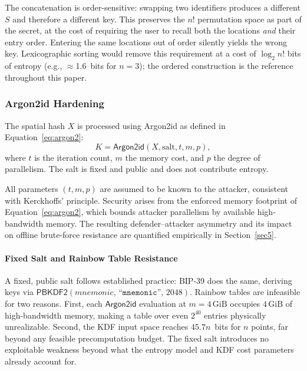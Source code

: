\documentclass[mathematics,article,accept,pdftex,moreauthors]{Definitions/mdpi}
\begin{document}
{The concatenation is order-sensitive: swapping two identifiers produces a different $S$ and therefore a different key. This preserves the $n!$ permutation space as part of the secret, at the cost of requiring the user to recall both the locations \emph{and} their entry order. Entering the same locations out of order silently yields the wrong key. Lexicographic sorting would remove this requirement at a cost of $\log_2 n!$ bits of entropy (e.g., $\approx$1.6~bits for $n=3$); the ordered construction is the reference throughout this paper.}

\subsubsection{Argon2id Hardening}

The spatial hash $X$ is processed using Argon2id as defined in Equation~\eqref{eq:argon2}:
\begin{equation}
K = \mathsf{Argon2id}(X, \text{salt}, t, m, p),
\label{eq:argon2}
\end{equation}
where $t$ is the iteration count, $m$ the memory cost, and $p$ the degree of parallelism. The salt is fixed and public and does not contribute entropy.

All parameters $(t,m,p)$ are assumed to be known to the attacker, consistent with Kerckhoffs’ principle. Security arises from the enforced memory footprint of Equation~\eqref{eq:argon2}, which bounds attacker parallelism by available high-bandwidth memory. The resulting defender--attacker asymmetry and its impact on offline brute-force resistance are quantified empirically in Section~\ref{sec5}.

\paragraph*{Fixed Salt and Rainbow Table Resistance} 

{A fixed, public salt follows established practice: BIP-39 does the same, deriving keys via $\mathsf{PBKDF2}(\textit{mnemonic},\,\texttt{``mnemonic''},\,2048)$. Rainbow tables are infeasible for two reasons. First, each $\mathsf{Argon2id}$ evaluation at $m=4\,\mathrm{GiB}$ occupies $4\,\mathrm{GiB}$ of high-bandwidth memory, making a table over even $2^{40}$ entries physically unrealizable. Second, the KDF input space reaches $45.7n$~bits for $n$ points, far beyond any feasible precomputation budget. The fixed salt introduces no exploitable weakness beyond what the entropy model and KDF cost parameters already account for.}
\end{document}
